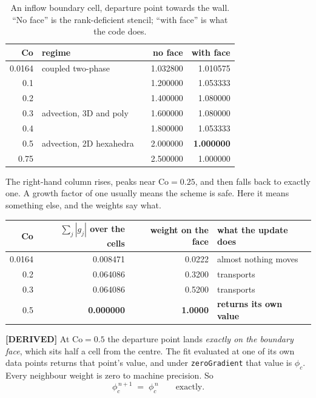 \documentclass[11pt,a4paper]{article}
\newcommand{\derived}{\textcolor{blue!50!black}{\textbf{[DERIVED]}}}
\begin{document}
\begin{table}[h]
\centering
\caption{An inflow boundary cell, departure point towards the wall. ``No face'' is the
rank-deficient stencil; ``with face'' is what the code does.}
\label{tab:frozen}
\begin{tabular}{rllrr}
\toprule
Co & regime & & no face & with face \\
\midrule
0.0164 & coupled two-phase       & & 1.032800 & 1.010575 \\
0.1    &                         & & 1.200000 & 1.053333 \\
0.2    &                         & & 1.400000 & 1.080000 \\
0.3    & advection, 3D and poly  & & 1.600000 & 1.080000 \\
0.4    &                         & & 1.800000 & 1.053333 \\
0.5    & advection, 2D hexahedra & & 2.000000 & \textbf{1.000000} \\
0.75   &                         & & 2.500000 & 1.000000 \\
\bottomrule
\end{tabular}
\end{table}

The right-hand column rises, peaks near $\mathrm{Co} = 0.25$, and then falls back to exactly
one. A growth factor of one usually means the scheme is safe. Here it means something else, and
the weights say what.

\begin{center}
\begin{tabular}{rrrl}
\toprule
Co & $\sum_j |g_j|$ over the cells & weight on the face & what the update does \\
\midrule
0.0164 & 0.008471 & 0.0222 & almost nothing moves \\
0.2    & 0.064086 & 0.3200 & transports \\
0.3    & 0.064086 & 0.5200 & transports \\
0.5    & \textbf{0.000000} & \textbf{1.0000} & \textbf{returns its own value} \\
\bottomrule
\end{tabular}
\end{center}

\derived{} At $\mathrm{Co} = 0.5$ the departure point lands \emph{exactly on the boundary face},
which sits half a cell from the centre. The fit evaluated at one of its own data points returns
that point's value, and under \texttt{zeroGradient} that value is $\phi_c$. Every neighbour
weight is zero to machine precision. So
\begin{equation}
  \phi_c^{\,n+1} \;=\; \phi_c^{\,n} \qquad\text{exactly.}
\end{equation}
\end{document}
